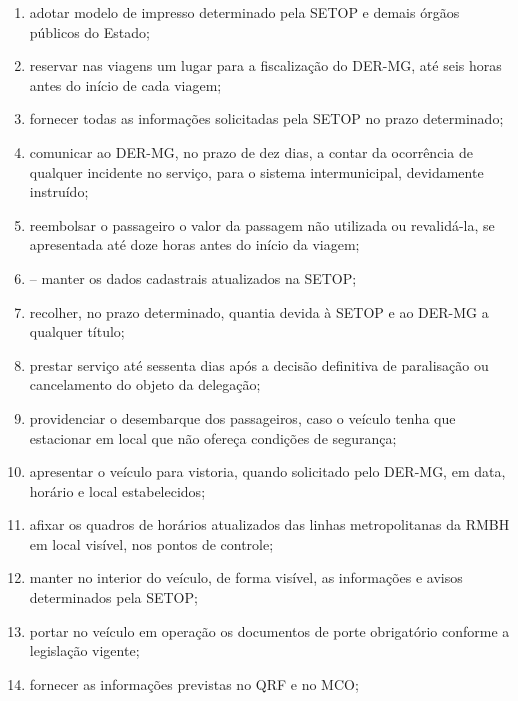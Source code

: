 \begin{enumerate}[resume, label=Art. \arabic*]
\begin{enumerate}[label=\roman*.]
\item adotar modelo de impresso determinado pela SETOP e demais órgãos públicos do Estado;

\item reservar nas viagens um lugar para a fiscalização do DER-MG, até seis horas antes do início de cada viagem;

\item fornecer todas as informações solicitadas pela SETOP no prazo determinado;

\item comunicar ao DER-MG, no prazo de dez dias, a contar da ocorrência de qualquer incidente no serviço, para o sistema intermunicipal, devidamente instruído;

\item reembolsar o passageiro o valor da passagem não utilizada ou revalidá-la, se apresentada até doze horas antes do início da viagem;

\item – manter os dados cadastrais atualizados na SETOP;

\item recolher, no prazo determinado, quantia devida à SETOP e ao DER-MG a qualquer título;

\item prestar serviço até sessenta dias após a decisão definitiva de paralisação ou cancelamento do objeto da delegação;

\item providenciar o desembarque dos passageiros, caso o veículo tenha que estacionar em local que não ofereça condições de segurança;

\item apresentar o veículo para vistoria, quando solicitado pelo DER-MG, em data, horário e local estabelecidos;

\item afixar os quadros de horários atualizados das linhas metropolitanas da RMBH em local visível, nos pontos de controle;

\item manter no interior do veículo, de forma visível, as informações e avisos determinados pela SETOP;

\item portar no veículo em operação os documentos de porte obrigatório conforme a legislação vigente;

\item fornecer as informações previstas no QRF e no MCO;


\end{enumerate}
\end{enumerate}
